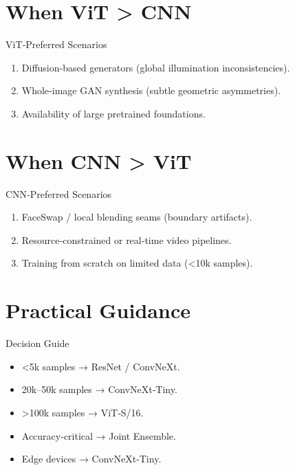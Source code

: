 \documentclass{beamer}
\begin{document}
\section{When ViT > CNN}
\begin{frame}{ViT‑Preferred Scenarios}
  \begin{enumerate}
    \item Diffusion‑based generators (global illumination inconsistencies).
    \item Whole‑image GAN synthesis (subtle geometric asymmetries).
    \item Availability of large pretrained foundations.
  \end{enumerate}
\end{frame}

\section{When CNN > ViT}
\begin{frame}{CNN‑Preferred Scenarios}
  \begin{enumerate}
    \item FaceSwap / local blending seams (boundary artifacts).
    \item Resource‑constrained or real‑time video pipelines.
    \item Training from scratch on limited data (<10k samples).
  \end{enumerate}
\end{frame}

\section{Practical Guidance}
\begin{frame}{Decision Guide}
  \begin{itemize}
    \item <5k samples → ResNet / ConvNeXt.
    \item 20k–50k samples → ConvNeXt‑Tiny.
    \item >100k samples → ViT‑S/16.
    \item Accuracy‑critical → Joint Ensemble.
    \item Edge devices → ConvNeXt‑Tiny.
  \end{itemize}
\end{frame}
\end{document}
